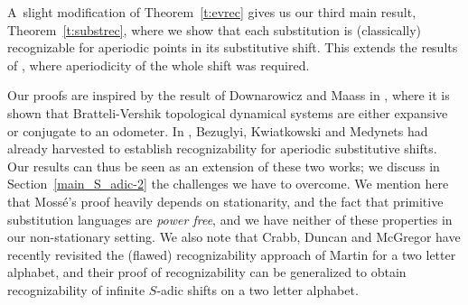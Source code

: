\documentclass{amsart}
\theoremstyle{definition}
\theoremstyle{remark}
\numberwithin{equation}{section}
\begin{document}
A~slight modification of Theorem~\ref{t:evrec} gives us our third main result, Theorem~\ref{t:substrec}, where we show that each substitution is (classically) recognizable for aperiodic points in its substitutive shift. 
This extends the results of \cite{Bezugly:2009}, where aperiodicity of the whole shift was required. 

Our proofs are inspired by the result of Downarowicz and Maass in \cite{Down:2008}, where it is shown that Bratteli-Vershik topological dynamical systems are either expansive or conjugate to an odometer. 
In \cite{Bezugly:2009}, Bezuglyi, Kwiatkowski and Medynets had already harvested \cite{Down:2008} to establish recognizability for aperiodic substitutive shifts. 
Our results can thus be seen as an extension of these two works; we discuss in Section~\ref{main_S_adic-2} the challenges we have to overcome. 
We mention here that Moss\'{e}'s proof heavily depends on stationarity, and the fact that primitive substitution languages are \emph{power free}, and we have neither of these properties in our non-stationary setting. 
We also note that  Crabb, Duncan and McGregor \cite{Crabb:10} have recently revisited the (flawed) recognizability approach of Martin \cite{Martin:71}  for a two letter alphabet, and 
their proof of recognizability can be generalized to obtain recognizability of infinite $S$-adic shifts on a two letter alphabet.
\end{document}
